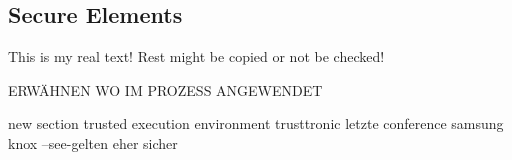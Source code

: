 \subsection{Secure Elements}\label{subsection:external-secure}
This is my real text! Rest might be copied or not be checked!


ERWÄHNEN WO IM PROZESS ANGEWENDET\newline

new section trusted execution environment
trusttronic letzte conference
samsung knox
--see-gelten eher sicher
